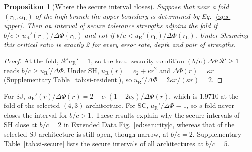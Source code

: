 \documentclass[fleqn,10pt]{wlscirep}
\newcommand{\Rmap}{\mathscr{R}}            %
\theoremstyle{plain}
\newtheorem{proposition}[lemma]{Proposition}
\begin{document}
\begin{proposition}[Where the secure interval closes]\label{prop:closing}
Suppose that near a fold $(r_{\mathrm L},\alpha_{\mathrm L})$ of the high branch the upper boundary is determined by Eq.~\eqref{eq:s-upper}. Then an interval of secure tolerance strengths adjoins the fold if $b/c>u_{\mathrm R}'(r_{\mathrm L})/\Delta\Phi(r_{\mathrm L})$ and not if $b/c<u_{\mathrm R}'(r_{\mathrm L})/\Delta\Phi(r_{\mathrm L})$. Under Shunning this critical ratio is exactly 2 for every error rate, depth and pair of strengths.
\end{proposition}
\begin{proof}
At the fold, $\Rmap'u_{\mathrm R}'=1$, so the local security condition $(b/c)\Delta\Phi\,\Rmap'\geq1$ reads $b/c\geq u_{\mathrm R}'/\Delta\Phi$. Under SH, $u_{\mathrm R}(r)=e_2+\kappa r^2$ and $\Delta\Phi(r)=\kappa r$ (Supplementary Table~\ref{tab:si-resident}), so $u_{\mathrm R}'/\Delta\Phi=2\kappa r/(\kappa r)=2$.
\end{proof}

For SJ, $u_{\mathrm R}'(r)/\Delta\Phi(r)=2-e_1(1-2e_2)/\Delta\Phi(r)$, which is 1.9710 at the fold of the selected $(4,3)$ architecture. For SC, $u_{\mathrm R}'/\Delta\Phi=1$, so a fold never closes the interval for $b/c>1$. These results explain why the secure intervals of SH close at $b/c=2$ in Extended Data Fig.~\ref{ed:security}c, whereas that of the selected SJ architecture is still open, though narrow, at $b/c=2$. Supplementary Table~\ref{tab:si-secure} lists the secure intervals of all architectures at $b/c=5$.
\end{document}
